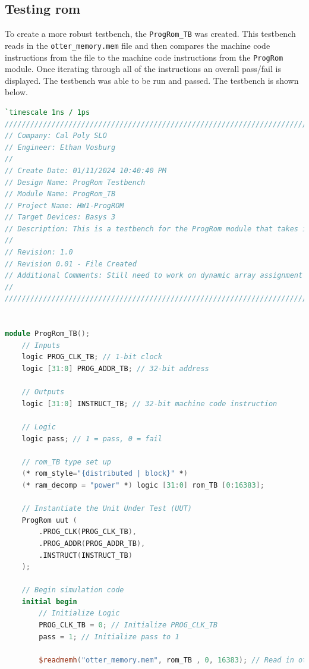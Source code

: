 \documentclass[
    a4paper, %
	12pt, %
    ]{CSSullivanBusinessReport}
\begin{document}
\begin{fullwidth}
\section{Testing rom} %

To create a more robust testbench, the \verb|ProgRom_TB| was created. This testbench reads in the \verb|otter_memory.mem| file and then compares the machine code instructions from the file to the machine code instructions from the \verb|ProgRom| module. Once iterating through all of the instructions an overall pass/fail is displayed. The testbench was able to be run and passed. The testbench is shown below.

\begin{lstlisting}[language=Verilog, caption=Verilog Testbench for ProgRom]
`timescale 1ns / 1ps
//////////////////////////////////////////////////////////////////////////////////
// Company: Cal Poly SLO
// Engineer: Ethan Vosburg
// 
// Create Date: 01/11/2024 10:40:40 PM
// Design Name: ProgRom Testbench
// Module Name: ProgRom_TB
// Project Name: HW1-ProgROM
// Target Devices: Basys 3
// Description: This is a testbench for the ProgRom module that takes in a mem file and checks that the program memory is correct
// 
// Revision: 1.0
// Revision 0.01 - File Created
// Additional Comments: Still need to work on dynamic array assignment
// 
//////////////////////////////////////////////////////////////////////////////////


module ProgRom_TB();
    // Inputs
    logic PROG_CLK_TB; // 1-bit clock
    logic [31:0] PROG_ADDR_TB; // 32-bit address

    // Outputs
    logic [31:0] INSTRUCT_TB; // 32-bit machine code instruction

    // Logic
    logic pass; // 1 = pass, 0 = fail

    // rom_TB type set up
    (* rom_style="{distributed | block}" *)
	(* ram_decomp = "power" *) logic [31:0] rom_TB [0:16383];

    // Instantiate the Unit Under Test (UUT)
    ProgRom uut (
        .PROG_CLK(PROG_CLK_TB), 
        .PROG_ADDR(PROG_ADDR_TB), 
        .INSTRUCT(INSTRUCT_TB)
    );

    // Begin simulation code
    initial begin
        // Initialize Logic
        PROG_CLK_TB = 0; // Initialize PROG_CLK_TB
        pass = 1; // Initialize pass to 1
        
        $readmemh("otter_memory.mem", rom_TB , 0, 16383); // Read in otter_memory.mem file


\end{lstlisting}
\end{fullwidth}
\end{document}
